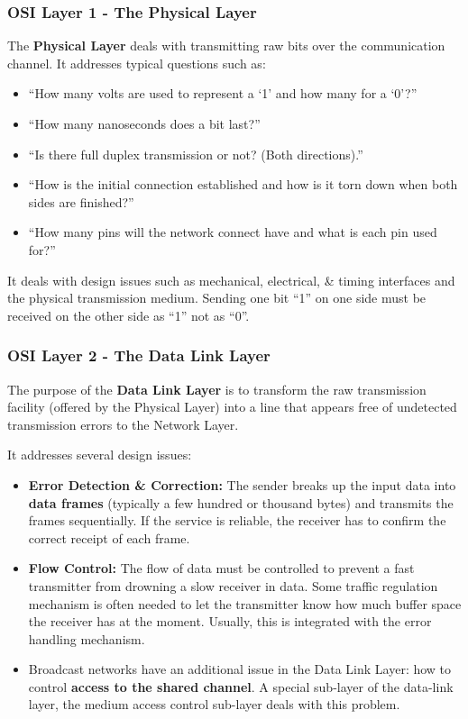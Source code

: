 \documentclass[11pt]{article}
\begin{document}
\subsubsection{OSI Layer 1 - The Physical Layer}
The \textbf{Physical Layer} deals with transmitting raw bits over the communication channel. 
It addresses typical questions such as:
\begin{itemize}
    \item   ``How many volts are used to represent a `1' and how many for a `0'?''
    \item   ``How many nanoseconds does a bit last?''
    \item   ``Is there full duplex transmission or not? (Both directions).''
    \item   ``How is the initial connection established and how is it torn down when both sides are finished?''
    \item   ``How many pins will the network connect have and what is each pin used for?''
\end{itemize} 

It deals with design issues such as mechanical, electrical, \& timing interfaces and the physical transmission medium. 
Sending one bit ``1'' on one side must be received on the other side as ``1'' not as ``0''.
        
\subsubsection{OSI Layer 2 - The Data Link Layer}
The purpose of the \textbf{Data Link Layer} is to transform the raw transmission facility (offered by the Physical Layer) into
a line that appears free of undetected transmission errors to the Network Layer. 

It addresses several design issues:
\begin{itemize}
    \item   \textbf{Error Detection \& Correction:} The sender breaks up the input data into \textbf{data frames} (typically a 
            few hundred or thousand bytes) and transmits the frames sequentially. 
            If the service is reliable, the receiver has to confirm the correct receipt of each frame. 
    \item   \textbf{Flow Control:} The flow of data must be controlled to prevent a fast transmitter from drowning a slow 
            receiver in data. 
            Some traffic regulation mechanism is often needed to let the transmitter know how much buffer space the receiver 
            has at the moment. 
            Usually, this is integrated with the error handling mechanism. 
    \item   Broadcast networks have an additional issue in the Data Link Layer: how to control \textbf{access to the shared channel}. 
            A special sub-layer of the data-link layer, the medium access control sub-layer deals with this problem. 
\end{itemize} 
\end{document}
